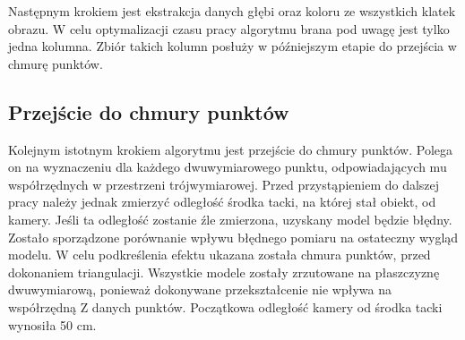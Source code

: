 Następnym krokiem jest ekstrakcja danych głębi oraz koloru ze wszystkich klatek obrazu. W celu optymalizacji czasu pracy algorytmu brana pod uwagę jest tylko jedna kolumna. Zbiór takich kolumn posłuży w późniejszym etapie do przejścia w chmurę punktów.
\subsection{Przejście do chmury punktów}
Kolejnym istotnym krokiem algorytmu jest przejście do chmury punktów. Polega on na wyznaczeniu dla każdego dwuwymiarowego punktu, odpowiadających mu współrzędnych w przestrzeni trójwymiarowej. Przed przystąpieniem do dalszej pracy należy jednak zmierzyć odległość środka tacki, na której stał obiekt, od kamery. Jeśli ta odległość zostanie źle zmierzona, uzyskany model będzie błędny. Zostało sporządzone porównanie wpływu błędnego pomiaru na ostateczny wygląd modelu. W celu podkreślenia efektu ukazana została chmura punktów, przed dokonaniem triangulacji. Wszystkie modele zostały zrzutowane na płaszczyznę dwuwymiarową, ponieważ dokonywane przekształcenie nie wpływa na współrzędną Z danych punktów. Początkowa odległość kamery od środka tacki wynosiła 50 cm.

